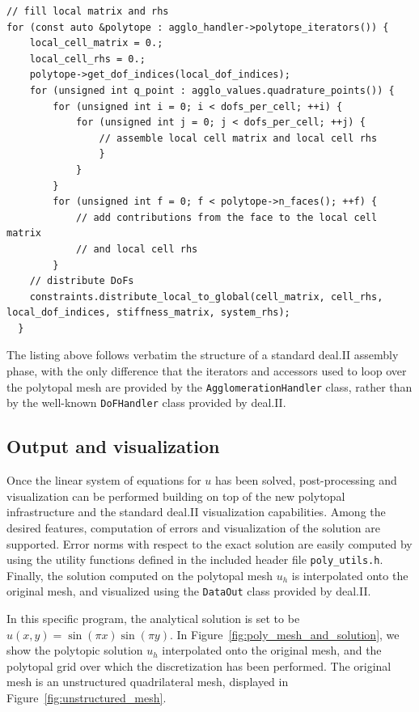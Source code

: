 \documentclass[a4paper,12pt]{article}
\begin{document}
\begin{lstlisting}[caption=Assembly of stiffness matrix and rhs vector]
   // fill local matrix and rhs
for (const auto &polytope : agglo_handler->polytope_iterators()) {
    local_cell_matrix = 0.;
    local_cell_rhs = 0.;
    polytope->get_dof_indices(local_dof_indices);
    for (unsigned int q_point : agglo_values.quadrature_points()) {
        for (unsigned int i = 0; i < dofs_per_cell; ++i) {
            for (unsigned int j = 0; j < dofs_per_cell; ++j) {
                // assemble local cell matrix and local cell rhs
                }
            }
        }
        for (unsigned int f = 0; f < polytope->n_faces(); ++f) {
            // add contributions from the face to the local cell matrix
            // and local cell rhs
        }
    // distribute DoFs
    constraints.distribute_local_to_global(cell_matrix, cell_rhs, local_dof_indices, stiffness_matrix, system_rhs);
  }
\end{lstlisting}

The listing above follows verbatim the structure of a standard deal.II assembly phase, with the only difference that the
iterators and accessors used to loop over the polytopal mesh are provided by the \texttt{AgglomerationHandler} class, rather
than by the well-known \texttt{DoFHandler} class provided by deal.II.


\subsection{Output and visualization}
Once the linear system of equations for $u$ has been solved, post-processing and visualization can be performed
building on top of the new polytopal infrastructure and the standard deal.II visualization capabilities.
Among the desired features, computation of errors and visualization of the solution are supported.
Error norms with respect to the exact solution are easily computed by using the
utility functions defined in the included header file \texttt{poly\_utils.h}. Finally, the solution
computed on the polytopal mesh $u_h$ is interpolated onto the original mesh, and visualized using the \texttt{DataOut} class
provided by deal.II.

In this specific program, the analytical solution is set to be $u(x,y)=\sin(\pi x)\sin(\pi y)$. In Figure~\ref{fig:poly_mesh_and_solution}, we
show the polytopic solution $u_h$ interpolated onto the original mesh, and the polytopal grid over which the discretization has
been performed. The original mesh is an unstructured quadrilateral mesh, displayed in Figure~\ref{fig:unstructured_mesh}.
\end{document}
